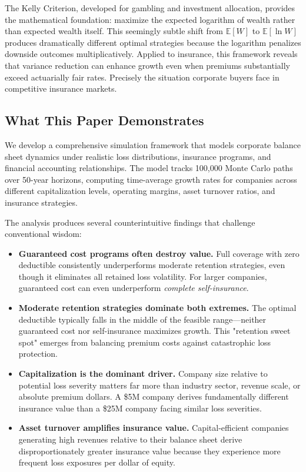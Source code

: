 \documentclass[11pt,letterpaper]{article}
\begin{document}
The Kelly Criterion, developed for gambling and investment allocation, provides the mathematical foundation: maximize the expected logarithm of wealth rather than expected wealth itself. This seemingly subtle shift from $\mathbb{E}[W]$ to $\mathbb{E}[\ln W]$ produces dramatically different optimal strategies because the logarithm penalizes downside outcomes multiplicatively. Applied to insurance, this framework reveals that variance reduction can enhance growth even when premiums substantially exceed actuarially fair rates. Precisely the situation corporate buyers face in competitive insurance markets.

\subsection{What This Paper Demonstrates}

We develop a comprehensive simulation framework that models corporate balance sheet dynamics under realistic loss distributions, insurance programs, and financial accounting relationships. The model tracks 100,000 Monte Carlo paths over 50-year horizons, computing time-average growth rates for companies across different capitalization levels, operating margins, asset turnover ratios, and insurance strategies.

The analysis produces several counterintuitive findings that challenge conventional wisdom:

\begin{itemize}
    \item \textbf{Guaranteed cost programs often destroy value.} Full coverage with zero deductible consistently underperforms moderate retention strategies, even though it eliminates all retained loss volatility. For larger companies, guaranteed cost can even underperform \emph{complete self-insurance}.

    \item \textbf{Moderate retention strategies dominate both extremes.} The optimal deductible typically falls in the middle of the feasible range—neither guaranteed cost nor self-insurance maximizes growth. This "retention sweet spot" emerges from balancing premium costs against catastrophic loss protection.

    \item \textbf{Capitalization is the dominant driver.} Company size relative to potential loss severity matters far more than industry sector, revenue scale, or absolute premium dollars. A \$5M company derives fundamentally different insurance value than a \$25M company facing similar loss severities.

    \item \textbf{Asset turnover amplifies insurance value.} Capital-efficient companies generating high revenues relative to their balance sheet derive disproportionately greater insurance value because they experience more frequent loss exposures per dollar of equity.
\end{itemize}
\end{document}
